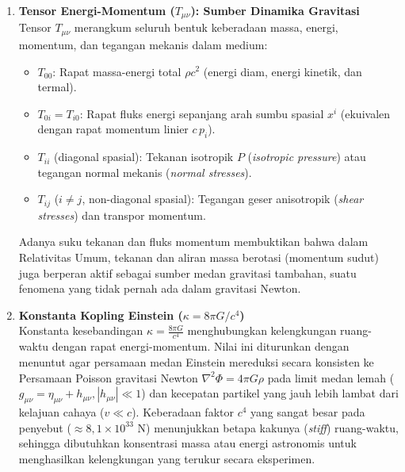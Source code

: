 \begin{enumerate}[label=(\alph*), wide=0pt, leftmargin=*]
    \item \textbf{Tensor Energi-Momentum ($T_{\mu\nu}$): Sumber Dinamika Gravitasi}\\
    Tensor $T_{\mu\nu}$ merangkum seluruh bentuk keberadaan massa, energi, momentum, dan tegangan mekanis dalam medium:
    \begin{itemize}[leftmargin=*]
        \item $T_{00}$: Rapat massa-energi total $\rho c^2$ (energi diam, energi kinetik, dan termal).
        \item $T_{0i} = T_{i0}$: Rapat fluks energi sepanjang arah sumbu spasial $x^i$ (ekuivalen dengan rapat momentum linier $c\, p_i$).
        \item $T_{ii}$ (diagonal spasial): Tekanan isotropik $P$ (\textit{isotropic pressure}) atau tegangan normal mekanis (\textit{normal stresses}).
        \item $T_{ij}$ ($i \neq j$, non-diagonal spasial): Tegangan geser anisotropik (\textit{shear stresses}) dan transpor momentum.
    \end{itemize}
    Adanya suku tekanan dan fluks momentum membuktikan bahwa dalam Relativitas Umum, tekanan dan aliran massa berotasi (momentum sudut) juga berperan aktif sebagai sumber medan gravitasi tambahan, suatu fenomena yang tidak pernah ada dalam gravitasi Newton.

    \item \textbf{Konstanta Kopling Einstein ($\kappa = 8\pi G / c^4$)}\\
    Konstanta kesebandingan $\kappa = \frac{8\pi G}{c^4}$ menghubungkan kelengkungan ruang-waktu dengan rapat energi-momentum. Nilai ini diturunkan dengan menuntut agar persamaan medan Einstein mereduksi secara konsisten ke Persamaan Poisson gravitasi Newton $\nabla^2 \Phi = 4\pi G \rho$ pada limit medan lemah ($g_{\mu\nu} = \eta_{\mu\nu} + h_{\mu\nu}, |h_{\mu\nu}| \ll 1$) dan kecepatan partikel yang jauh lebih lambat dari kelajuan cahaya ($v \ll c$). Keberadaan faktor $c^4$ yang sangat besar pada penyebut ($\approx 8{,}1 \times 10^{33}\text{ N}$) menunjukkan betapa kakunya (\textit{stiff}) ruang-waktu, sehingga dibutuhkan konsentrasi massa atau energi astronomis untuk menghasilkan kelengkungan yang terukur secara eksperimen.


\end{enumerate}
